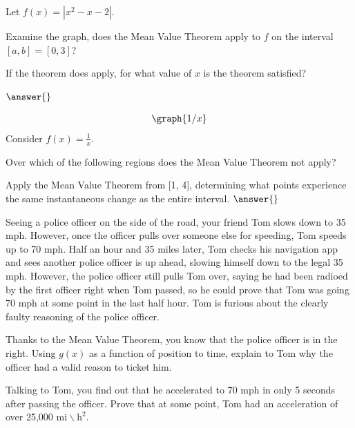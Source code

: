 \documentclass{ximera}
\begin{document}
Let $f(x)=\left|x^2-x-2\right|$.

\begin{question}
Examine the graph, does the Mean Value Theorem apply to $f$ on the interval $[a,b]=[0,3]$?

\begin{multipleChoice}
\end{multipleChoice}

If the theorem does apply, for what value of $x$ is the theorem satisfied?

$\answer{}$
\end{question}

\begin{question}
\[
\graph{1/x}
\]
Consider $f(x) = \frac{1}{x}$.

Over which of the following regions does the Mean Value Theorem not apply?

\begin{selectAll}
\choice{$[1,2]$}
\choice{$(0,4]$}
\choice[correct]{$[-1,1]$}
\choice[correct]{$[0,2]$}
\choice{$[-5,0)$}
\end{selectAll}

Apply the Mean Value Theorem from [1, 4], determining what points experience the same instantaneous change as the entire interval.
$\answer{}$
\end{question}

\begin{question}
Seeing a police officer on the side of the road, your friend Tom slows down to 35 mph. However, once the officer pulls over someone else for speeding, Tom speeds up to 70 mph. Half an hour and 35 miles later, Tom checks his navigation app and sees another police officer is up ahead, slowing himself down to the legal 35 mph. However, the police officer still pulls Tom over, saying he had been radioed by the first officer right when Tom passed, so he could prove that Tom was going 70 mph at some point in the last half hour. Tom is furious about the clearly faulty reasoning of the police officer.

Thanks to the Mean Value Theorem, you know that the police officer is in the right. Using $g(x)$ as a function of position to time, explain to Tom why the officer had a valid reason to ticket him.

\begin{freeResponse}
\end{freeResponse}

Talking to Tom, you find out that he accelerated to 70 mph in only 5 seconds after passing the officer. Prove that at some point, Tom had an acceleration of over 25,000 $\text{mi} \backslash \text{h}^2$.

\begin{freeResponse}
\end{freeResponse}
\end{question}
\end{document}
